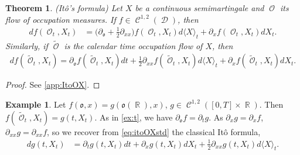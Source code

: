 \documentclass[11pt]{article}
\def\mo{\mathfrak{o}}
\theoremstyle{plain}
\newtheorem{theorem}{Theorem}[section]
\theoremstyle{definition}
\newtheorem{example}{Example}
\newtheorem{remark}{Remark}
\DeclareMathOperator{\R}{\mathbb{R}}
\DeclareMathOperator{\calC}{\mathcal{C}}
\DeclareMathOperator{\calD}{\mathcal{D}}
\DeclareMathOperator{\calM}{\mathcal{M}}
\DeclareMathOperator{\calO}{\mathcal{O}}
\begin{document}

\begin{theorem}\label{thm:ItoOX}
    \textnormal{{(Itô's formula)}} 
    Let $X$ be a continuous semimartingale and $\calO$ its flow of occupation measures. 
    If $f\in \calC^{1,2}(\calD)$, then  
       \begin{align}
       df(\calO_t,X_t) &= \Big(\partial_{\mo} + \frac{1}{2} \partial_{xx}\Big)f(\calO_t,X_t) d\langle X \rangle_t + \partial_x f(\calO_t,X_t)dX_t.\label{eq:itoOX}
    \end{align} 
Similarly, if $\tilde{\calO}$ is the calendar time occupation flow of $X$, then 
  \begin{align}\label{eq:itoOXstd}
       df(\tilde{\calO}_t,X_t) =  \partial_{\mo} f(\tilde{\calO}_t,X_t) dt   + \frac{1}{2} \partial_{xx}f(\tilde{\calO}_t,X_t) d\langle X \rangle_t + \partial_x f(\tilde{\calO}_t,X_t)dX_t.
    \end{align}
    
\end{theorem}

\begin{proof}
    See \ref{app:ItoOX}. 
\end{proof}


\begin{example}\label{ex:tx}
Let   $f(\mo,x) = g(\mo(\R),x)$,  $g\in \calC^{1,2}([0,T]\times \R)$. Then $f(\tilde{\calO}_t,X_t) = g(t,X_t)$. As in \cref{ex:t}, we have  $\partial_{\mo} f = \partial_t g$.  
As $\partial_x g =\partial_x f$, $\partial_{xx} g =\partial_{xx} f$, so we  recover from \eqref{eq:itoOXstd} the classical It\^o formula, 
\begin{align*}
    dg(t,X_t) &= \partial_t g(t,X_t) dt  + \partial_x g(t,X_t)dX_t + \frac{1}{2} \partial_{xx}g(t,X_t) d\langle X \rangle_t. 
\end{align*}
\end{example}
\end{document}
